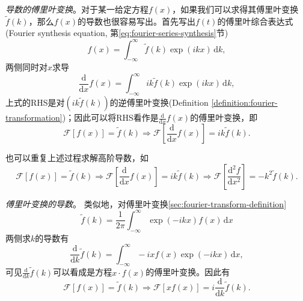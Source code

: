 \textit{导数的傅里叶变换}。对于某一给定方程$f(x)$，如果我们可以求得其傅里叶变换$\tilde{f}(k)$，那么$f(x)$的导数也很容易写出。首先写出$f(t)$的傅里叶综合表达式(Fourier synthesis equation, 第\ref{eq:fourier-series-synthesis}节)
\begin{equation*}
  f(x) = \int_{-\infty}^{\infty} \tilde{f}(k) \exp \left( i k x \right) \, \mathrm{d} k,
\end{equation*}
两侧同时对$x$求导
\begin{equation*}
  \frac{\mathrm{d}}{\mathrm{d} x}f(x)
  = \int_{-\infty}^{\infty} i k \tilde{f}(k) \exp \left( i k x \right) \, \mathrm{d} k,
\end{equation*}
上式的RHS是对$\left( i k \widetilde{f} (k) \right)$的逆傅里叶变换(Definition \ref{definition:fourier-transformation})；因此可以将RHS看作是$\frac{\mathrm{d}}{\mathrm{d} x}f(x)$的傅里叶变换，即
\begin{equation}
  \label{eq:fourier-derivative-ft-eq}
  \mathcal{F}\left[ f(x) \right]
  = \tilde{f}(k) \Rightarrow \mathcal{F}
  \left[
  \frac{\mathrm{d}}{\mathrm{d} x}f \left( x \right)
  \right] = i k \tilde{f}(k).
\end{equation}

也可以重复上述过程求解高阶导数，如
\begin{equation}
  \label{eq:fourier-derivative-ft-eq-higher}
  \mathcal{F} \left[ f(x) \right] = \tilde{f}(k)
  \Rightarrow
  \mathcal{F} \left[ \frac{\mathrm{d}}{\mathrm{d} x} f(x) \right]
  = i k \tilde{f} (k)
  \Rightarrow
  \mathcal{F}
  \left[
  \frac{\mathrm{d}^{2}f}{\mathrm{d} x^2} \right]
  = - k^{2} \tilde{f}(k).
\end{equation}

\textit{傅里叶变换的导数}。
类似地，对傅里叶变换\eqref{sec:fourier-transform-definition}
\begin{equation*}
  \tilde{f} \left( k \right) =
  \frac{1}{2 \pi} \int_{-\infty}^{\infty}
  \exp \left( - i k x \right) f(x) \, \mathrm{d} x
\end{equation*}
两侧求$k$的导数有
\begin{equation*}
  \frac{\mathrm{d}}{\mathrm{d} k} \tilde{f}(k)
  = \int_{-\infty}^{\infty} - i x f(x) \exp \left( - i k x \right) \, \mathrm{d} x,
\end{equation*}
可见$\frac{\mathrm{d}}{\mathrm{d} k} \tilde{f}(k)$可以看成是方程$x \cdot f(x)$的傅里叶变换。因此有
\begin{equation}
  \label{eq:fourier-ft-derivative-eq}
  \mathcal{F}\left[ f(x) \right] = \tilde{f}(k)
  \Rightarrow \mathcal{F} \left[ x f(x) \right]
  = i \frac{\mathrm{d}}{\mathrm{d} k }\tilde{f}(k).
\end{equation}

